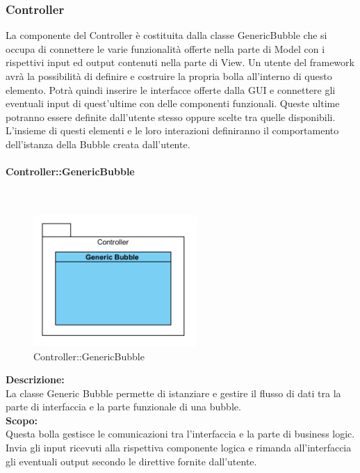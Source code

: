 \subsubsection{Controller}
La componente del Controller è costituita dalla classe Generic\-Bubble che si occupa di connettere le varie funzionalità offerte nella parte di Model con i rispettivi input ed output contenuti nella parte di View. Un utente del framework avrà la possibilità di definire e costruire la propria bolla all’interno di questo elemento. Potrà quindi inserire le interfacce offerte dalla GUI e connettere gli eventuali input di quest’ultime con delle componenti funzionali. Queste ultime potranno essere definite dall’utente stesso oppure scelte tra quelle disponibili. 
L’insieme di questi elementi e le loro interazioni definiranno il comportamento dell’istanza della Bubble creata dall’utente.
\begin{samepage}
\paragraph{Controller\-::Generic\-Bubble}\label{fm-generica}\mbox{}\\
\nopagebreak
\begin{figure}[H]
	\centering
	\includegraphics[height=5cm]{diagrammi_img/classi_e_package/bubble_generica.png}
	\caption{Controller\-::Generic\-Bubble}
\end{figure}
\end{samepage}
\textbf{Descrizione:}\\
La classe Generic Bubble permette di istanziare e gestire il flusso di dati tra la parte di interfaccia e la parte funzionale di una bubble.\\
\textbf{Scopo:}\\
Questa bolla gestisce le comunicazioni tra l’interfaccia e la parte di business logic. Invia gli input ricevuti alla rispettiva componente logica e rimanda all’interfaccia gli eventuali output secondo le direttive fornite dall’utente.


